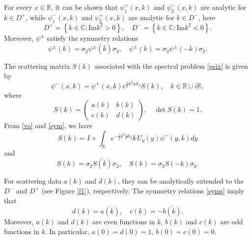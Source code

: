 \documentclass[preprint,compress,12pt]{elsarticle}
\numberwithin{equation}{section}
\begin{document}
 For every $x\in\mathbb{R}$, it can be shown that  $\psi_{1}^{+}(x,k)$ and $\psi_{2}^{-}(x,k)$ are analytic for $k\in D^{+}$, while $\psi_{1}^{-}(x,k)$ and $\psi_{2}^{+}(x,k)$ are analytic for $k\in D^{-}$, here
\begin{equation}
D^{+}=\left\{k\in\mathbb{C}:\text{Im} k^{2}>0\right\},\quad
D^{-}=\left\{k\in\mathbb{C}:\text{Im} k^{2}<0\right\}.
\end{equation}
Moreover, $\psi^{\pm}$ satisfy the symmetry relations
 \begin{equation}\label{sym}
\psi^{\pm}(k)=\sigma_{2}\overline{\psi^{\pm}(\overline{k})}\sigma_{2},\quad\psi^{\pm}(k)=\sigma_{3}\psi^{\pm}(-k)\sigma_{3}.
\end{equation}

The scattering matrix $S(k)$ associated with the spectral problem \eqref{psix} is given by
\begin{equation}\label{sca}
\psi^{-}(x,k)=\psi^{+}(x,k)e^{\frac{i}{2}k^{2}x\widehat{\sigma}_{3}}S(k),\quad k\in \mathbb{R}\cup i\mathbb{R},
\end{equation}
where
\begin{equation}
S(k)=\begin{pmatrix}a(k)&b(k)\\c(k)&d(k)\end{pmatrix},\quad \det S(k)=1.
\end{equation}
From \eqref{vo} and \eqref{sym}, we have
\begin{equation}\label{vos}
S(k)=I+\int_{\mathbb{R}}e^{-\frac{i}{2}k^{2}y\widehat{\sigma}_{3}}k\,U_{y}(y)\psi^{-}(y,k)dy
\end{equation}
and
\begin{equation}\label{syms}
S(k)=\sigma_{2}\overline{S(\overline{k})}\sigma_{2},\quad S(k)=\sigma_{3}S(-k)\sigma_{3}.
\end{equation}

For scattering data $a(k)$ and $d(k)$, they can be analytically extended to the $D^{-}$ and $D^{+}$ (see Figure \ref{f1}), respectively. The symmetry
relations \eqref{syms} imply that
\begin{equation}
d(k)=\overline{a(\overline{k})},\quad c(k)=-\overline{b(\overline{k})}.
\end{equation}
Moreover, $a(k)$ and $d(k)$ are even functions in $k$, $b(k)$ and $c(k)$ are odd functions in $k$. In particular, $a(0)=d(0)=1$, $b(0)=c(0)=0$.
\end{document}
